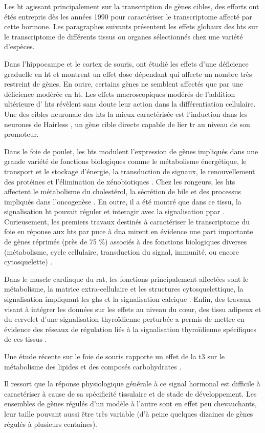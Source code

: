 \documentclass[../main.tex]{subfiles}
\begin{document}
		Les \gls{ht} agissant principalement sur la transcription de gènes cibles, des efforts ont étés entrepris dès les années 1990 pour caractériser le transcriptome affecté par cette hormone.
		Les paragraphes suivants présentent les effets globaux des \glspl{ht} sur le transcriptome de différents tissus ou organes sélectionnés chez une variété d'espèces.
		\par
		Dans l'hippocampe et le cortex de souris, \citet{Chatonnet2011} ont étudié les effets d'une déficience graduelle en \gls{ht} et montrent un effet dose dépendant qui affecte un nombre très restreint de gènes.
		En outre, certains gènes ne semblent affectés que par une déficience modérée en \gls{ht}.
		Les effets macroscopiques modérés de l'addition ultérieure d' \glspl{ht} révèlent sans doute leur action dans la différentiation cellulaire.
		Une des cibles neuronale des \glspl{ht} la mieux caractérisée est l'induction dans les neurones de Hairless \citep{Thompson1996}, un gène cible directe capable de lier \gls{tr} au niveau de son promoteur.
		\par
		Dans le foie de poulet, les \glspl{ht} modulent l'expression de gènes impliqués dans une grande variété de fonctions biologiques comme le métabolisme énergétique, le transport et le stockage d'énergie, la transduction de signaux, le renouvellement des protéines et l'élimination de xénobiotiques \citep{Wang2007}.
		Chez les rongeurs, les \glspl{ht} affectent le métabolisme du cholestérol, la sécrétion de bile et des processus impliqués dans l'oncogenèse \citep{Ventura-Holman2007}.
		En outre, il a été montré que dans ce tissu, la signalisation \gls{ht} pouvait réguler et interagir avec la signalisation \gls{ppar} \citep{Weitzel2003}.
		Curieusement, les premiers travaux destinés à caractériser le transcriptome du foie en réponse aux  \glspl{ht} par puce à \gls{dna} mirent en évidence une part importante de gènes réprimés (près de 75 \%) associés à des fonctions biologiques diverses (métabolisme, cycle cellulaire, transduction du signal, immunité, ou encore cytosquelette) \citep{Feng2000}.
		\par
		Dans le muscle cardiaque du rat, les fonctions principalement affectées sont le métabolisme, la matrice extra-cellulaire et les structures cytosquelettique, la signalisation impliquant les \glspl{gh} et la signalisation calcique \citep{De2004}.
		Enfin, des travaux visant à intégrer les données sur les effets au niveau du cœur, des tissu adipeux et du cervelet d'une signalisation thyroïdienne perturbée a permis de mettre en évidence des réseaux de régulation liés à la signalisation thyroïdienne spécifiques de ces tissus \citep{Miller2004}.
		\par
		Une étude récente sur le foie de souris rapporte un effet de la \gls{t3} sur le métabolisme des lipides et des composés carbohydrates \citep{Ramadoss2014}.
		\par
		Il ressort que la réponse physiologique générale à ce signal hormonal est difficile à caractériser à cause de sa spécificité tissulaire et de stade de développement.
		Les ensembles de gènes régulés d'un modèle à l'autre sont en effet peu chevauchants, leur taille pouvant aussi être très variable (d'à peine quelques dizaines de gènes régulés à plusieurs centaines).

\end{document}

